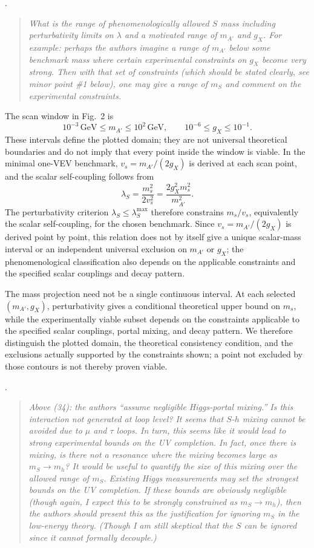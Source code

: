 \documentclass[12pt,a4paper]{article}
\begin{document}
\medskip
{}. \begin{quote}\itshape
What is the range of phenomenologically allowed \(S\) mass including perturbativity limits on \(\lambda\) and a motivated range of \(m_{A'}\) and \(g_X\). For example: perhaps the authors imagine a range of \(m_{A'}\) below some benchmark mass where certain experimental constraints on \(g_X\) become very strong. Then with that set of constraints (which should be stated clearly, see minor point \#1 below), one may give a range of \(m_S\) and comment on the experimental constraints.\end{quote}

The scan window in Fig.~2 is
\[
10^{-3}\,\mathrm{GeV}\leq m_{A'}\leq10^2\,\mathrm{GeV},
\qquad
10^{-6}\leq g_X\leq10^{-1}.
\]
These intervals define the plotted domain; they are not universal theoretical boundaries and do not imply that every point inside the window is viable. In the minimal one-VEV benchmark, \(v_s=m_{A'}/(2g_X)\) is derived at each scan point, and the scalar self-coupling follows from
\[
\lambda_S=\frac{m_s^2}{2v_s^2}
=\frac{2g_X^2m_s^2}{m_{A'}^2}.
\]
The perturbativity criterion \(\lambda_S\leq\lambda_S^{\max}\) therefore constrains \(m_s/v_s\), equivalently the scalar self-coupling, for the chosen benchmark. Since \(v_s=m_{A'}/(2g_X)\) is derived point by point, this relation does not by itself give a unique scalar-mass interval or an independent universal exclusion on \(m_{A'}\) or \(g_X\); the phenomenological classification also depends on the applicable constraints and the specified scalar couplings and decay pattern.

The mass projection need not be a single continuous interval. At each selected \((m_{A'},g_X)\), perturbativity gives a conditional theoretical upper bound on \(m_s\), while the experimentally viable subset depends on the constraints applicable to the specified scalar couplings, portal mixing, and decay pattern. We therefore distinguish the plotted domain, the theoretical consistency condition, and the exclusions actually supported by the constraints shown; a point not excluded by those contours is not thereby proven viable.

\medskip
{}. \begin{quote}\itshape
Above (34): the authors ``assume negligible Higgs-portal mixing.'' Is this interaction not generated at loop level? It seems that \(S\)-\(h\) mixing cannot be avoided due to \(\mu\) and \(\tau\) loops. In turn, this seems like it would lead to strong experimental bounds on the UV completion. In fact, once there is mixing, is there not a resonance where the mixing becomes large as \(m_S\to m_h\)? It would be useful to quantify the size of this mixing over the allowed range of \(m_S\). Existing Higgs measurements may set the strongest bounds on the UV completion. If these bounds are obviously negligible (though again, I expect this to be strongly constrained as \(m_S\to m_h\)), then the authors should present this as the justification for ignoring \(m_S\) in the low-energy theory. (Though I am still skeptical that the \(S\) can be ignored since it cannot formally decouple.)\end{quote}
\end{document}
